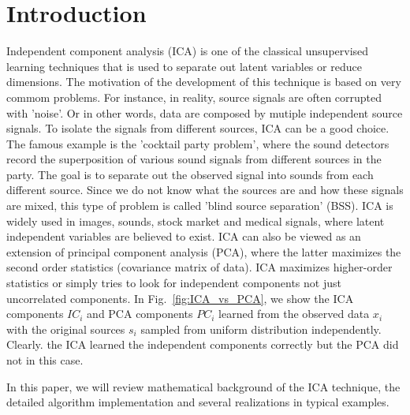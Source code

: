 \documentclass[aps,prl,preprint,superscriptaddress]{revtex4-2}
\begin{document}
\section{Introduction}
Independent component analysis (ICA) is one of the classical unsupervised learning techniques that is used to separate out latent variables or reduce dimensions. The motivation of the development of this technique is based on very commom problems. For instance, in reality, source signals are often corrupted with 'noise'. Or in other words, data are composed by mutiple independent source signals. To isolate the signals from different sources, ICA can be a good choice. The famous example is the 'cocktail party problem', where the sound detectors record the superposition of various sound signals from different sources in the party. The goal is to separate out the observed signal into sounds from each different source. Since we do not know what the sources are and how these signals are mixed, this type of problem is called 'blind source separation' (BSS). ICA is widely used in images, sounds, stock market and medical signals, where latent independent variables are believed to exist. ICA can also be viewed as an extension of principal component analysis (PCA), where the latter maximizes the second order statistics (covariance matrix of data). ICA maximizes higher-order statistics or simply tries to look for independent components not just uncorrelated components. In Fig.~\ref{fig:ICA_vs_PCA}, we show the ICA components $IC_{i}$ and PCA components $PC_{i}$ learned from the observed data $x_{i}$ with the original sources $s_{i}$ sampled from uniform distribution independently. Clearly. the ICA learned the independent components correctly but the PCA did not in this case. 

In this paper, we will review mathematical background of the ICA technique, the detailed algorithm implementation and several realizations in typical examples. 
\end{document}
